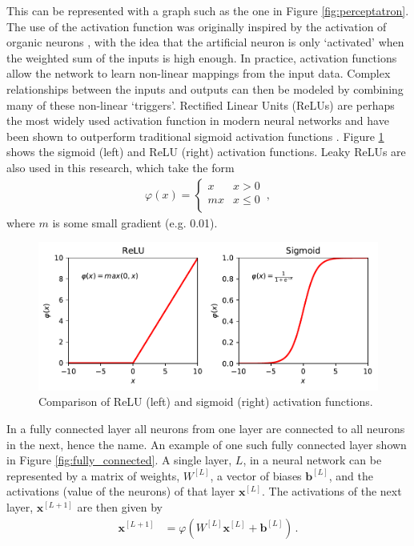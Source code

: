 \documentclass[11pt,a4paper,onecolumn]{report}
\begin{document}
This can be represented with a graph such as the one in Figure
\ref{fig:perceptatron}. The use of the activation function was originally
inspired by the activation of organic neurons \citep{hodgkin1952}, with the idea
that the artificial neuron is only `activated' when the weighted sum of the
inputs is high enough. In practice, activation functions allow the network to
learn non-linear mappings from the input data. Complex relationships between the
inputs and outputs can then be modeled by combining many of these non-linear
`triggers'. Rectified Linear Units (ReLUs) are perhaps the most widely used
activation function in modern neural networks and have been shown to outperform
traditional sigmoid activation functions \citep{glorot2011}. Figure
\ref{fig:activation} shows the sigmoid (left) and ReLU (right) activation
functions. Leaky ReLUs are also used in this research, which take the form
\begin{align}
  \varphi (x) = \begin{cases} 
    x & x > 0 \\
    m x & x \leq 0 \\
 \end{cases} \, ,
\end{align}
where $m$ is some small gradient (e.g. 0.01).\\


\begin{figure}[t]
  \centering
  \includegraphics[width=0.8\linewidth]{sigmoid_v_relu.pdf}
  \caption{Comparison of ReLU (left) and sigmoid (right) activation functions.}
  \label{fig:activation}
\end{figure}

In a fully connected layer all neurons from one layer are connected to all
neurons in the next, hence the name. An example of one such fully connected
layer shown in Figure \ref{fig:fully_connected}. A single layer, \(L\), in a
neural network can be represented by a matrix of weights, \(W^{[L]}\), a
vector of biases \(\bm{b}^{[L]}\), and the activations (value of the neurons) of
that layer \(\bm{x}^{[L]}\). The activations of the next layer,
\(\bm{x}^{[L+1]}\) are then given by
\begin{align}
  \label{eqn:matrix_repr}
  \bm{x}^{[L+1]} &= \varphi \left(W^{[L]}\bm{x}^{[L]} +\bm{b}^{[L]}\right)\,.
\end{align}
\\
\end{document}
